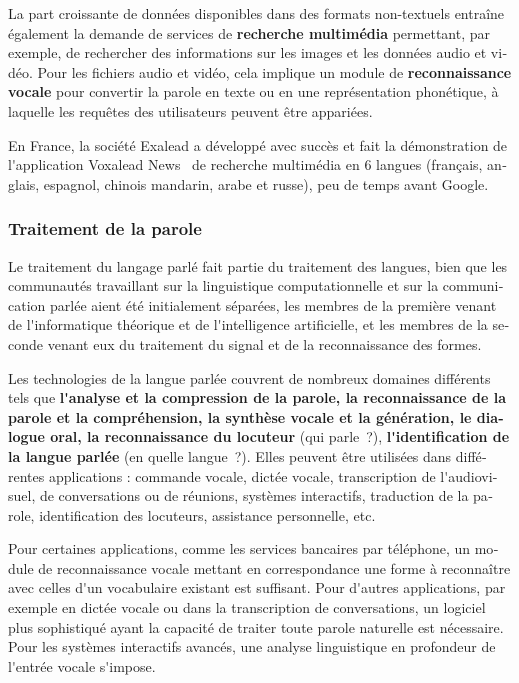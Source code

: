 \begin{french}
\begin{multicols}{2}
La part croissante de données disponibles dans des formats non-textuels
entraîne également la demande de services de {\bf recherche multimédia}
permettant, par exemple, de rechercher des informations sur les
images et les données audio et vidéo. Pour les fichiers audio et vidéo, cela
implique un module de {\bf reconnaissance vocale} pour convertir la parole
en texte ou en une représentation phonétique, à laquelle les requêtes
des utilisateurs peuvent être appariées.

En France, la société Exalead a développé avec succès et fait la démonstration de 
l{\mbox '}application Voxalead News~\cite{voxaleadnews} de recherche multimédia en 6 langues
(français, anglais, espagnol, chinois mandarin, arabe et russe),
peu de temps avant Google.

\subsubsection{Traitement de la parole}
Le traitement du langage parlé fait partie du traitement des langues,
bien que les communautés travaillant sur la linguistique
computationnelle et sur la communication parlée aient été initialement
séparées, les membres de la première venant de l{\mbox '}informatique
théorique et de l{\mbox '}intelligence artificielle, et les membres de
la seconde venant eux du traitement du signal et de la reconnaissance
des formes.

Les technologies de la langue parlée couvrent de nombreux domaines
différents tels que {\bf l{\mbox '}analyse et la compression de la
  parole, la reconnaissance de la parole et la compréhension, la
  synthèse vocale et la génération, le dialogue oral, la
  reconnaissance du locuteur} (qui parle~?), {\bf l{\mbox
    '}identification de la langue parlée} (en quelle langue~?). Elles
peuvent être utilisées dans différentes applications : commande
vocale, dictée vocale, transcription de l{\mbox '}audiovisuel, de
conversations ou de réunions, systèmes interactifs, traduction de la
parole, identification des locuteurs, assistance personnelle, etc.

Pour certaines applications, comme les services bancaires par
téléphone, un module de reconnaissance vocale mettant en
correspondance une forme à reconnaître avec celles d{\mbox '}un vocabulaire
existant est suffisant. Pour d{\mbox '}autres applications, par exemple en
dictée vocale ou dans la transcription de conversations, un logiciel
plus sophistiqué ayant la capacité de traiter toute parole naturelle
est nécessaire. Pour les systèmes interactifs avancés, une analyse
linguistique en profondeur de l{\mbox '}entrée vocale s{\mbox '}impose.


\end{multicols}
\end{french}
